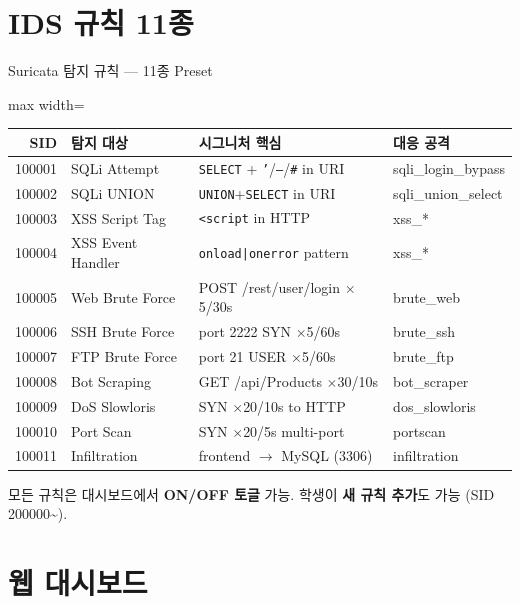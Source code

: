 \documentclass[aspectratio=169,10pt]{beamer}
\newcommand{\hlt}[1]{\textcolor{accent}{\textbf{#1}}}
\newcommand{\blue}[1]{\textcolor{blueTeam}{\textbf{#1}}}
\begin{document}
\section{IDS 규칙 11종}

\begin{frame}{Suricata 탐지 규칙 — 11종 Preset}
\begin{adjustbox}{max width=\textwidth}
\footnotesize
\begin{tabular}{rlll}
\toprule
\textbf{SID} & \textbf{탐지 대상} & \textbf{시그니처 핵심} & \textbf{대응 공격} \\
\midrule
100001 & SQLi Attempt & \texttt{SELECT} + \texttt{'}/\texttt{--}/\texttt{\#} in URI & sqli\_login\_bypass \\
100002 & SQLi UNION & \texttt{UNION}+\texttt{SELECT} in URI & sqli\_union\_select \\
100003 & XSS Script Tag & \texttt{<script} in HTTP & xss\_* \\
100004 & XSS Event Handler & \texttt{onload|onerror} pattern & xss\_* \\
100005 & Web Brute Force & POST /rest/user/login $\times$5/30s & brute\_web \\
100006 & SSH Brute Force & port 2222 SYN $\times$5/60s & brute\_ssh \\
100007 & FTP Brute Force & port 21 USER $\times$5/60s & brute\_ftp \\
100008 & Bot Scraping & GET /api/Products $\times$30/10s & bot\_scraper \\
100009 & DoS Slowloris & SYN $\times$20/10s to HTTP & dos\_slowloris \\
100010 & Port Scan & SYN $\times$20/5s multi-port & portscan \\
100011 & Infiltration & frontend $\rightarrow$ MySQL (3306) & infiltration \\
\bottomrule
\end{tabular}
\end{adjustbox}
\vspace{0.3em}

{\footnotesize 모든 규칙은 대시보드에서 \blue{ON/OFF 토글} 가능. 학생이 \hlt{새 규칙 추가}도 가능 (SID 200000\textasciitilde).}
\end{frame}

\section{웹 대시보드}
\end{document}
